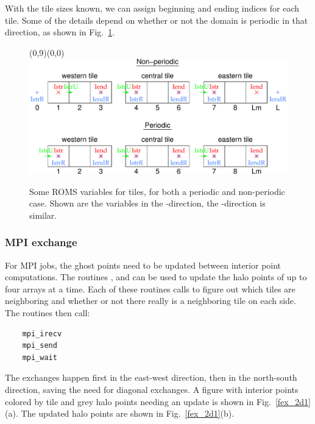 With the tile sizes known, we can assign beginning and ending
indices for each tile. Some of the details depend on whether or
not the domain is periodic in that direction, as shown in Fig.\
\ref{ftile3}.

\begin{figure}[tb]
\setlength{\unitlength}{10mm}
\begin{picture}(0,9)(0,0)
\includegraphics[width=165mm]{pics/Istr}
  \end{picture}
  \caption{Some ROMS variables for tiles, for both a periodic and
  non-periodic case. Shown are the variables in the
  -direction, the -direction is similar.}
  \label{ftile3}
\end{figure}

\subsubsection{MPI exchange}

For MPI jobs, the ghost points need to be updated between
interior point computations. The routines
,  and
 can be used to update the halo points of
up to four arrays at a time. Each of these routines calls
 to figure out which tiles are neighboring and
whether or not there really is a neighboring tile on each side. The
\code{mp\_exchangexd} routines then call:
\begin{verbatim}
    mpi_irecv
    mpi_send
    mpi_wait
\end{verbatim}
The exchanges happen first in the east-west direction, then in the
north-south direction, saving the need for diagonal exchanges. A figure
with interior points colored by tile and grey halo points needing an
update is shown in Fig.\ \ref{fex_2d1}(a). The updated halo points are
shown in Fig.\ \ref{fex_2d1}(b).

